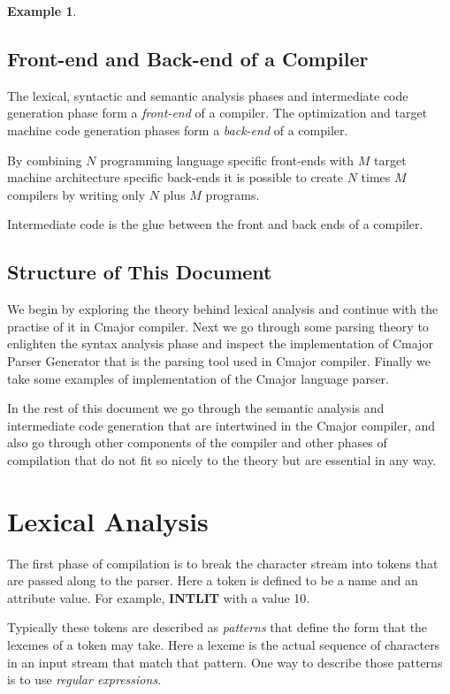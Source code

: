 \documentclass[a4paper,oneside,11pt]{book}
\theoremstyle{definition}
\newtheorem{exmp}{Example}[section]
\begin{document}
\begin{exmp}
\begin{enumerate}
\section{Front-end and Back-end of a Compiler}

The lexical, syntactic and semantic analysis phases and intermediate code generation phase
form a \emph{front-end} of a compiler. The optimization and target machine code generation phases
form a \emph{back-end} of a compiler.

By combining $N$ programming language specific front-ends with $M$ target machine architecture specific back-ends
it is possible to create $N$ times $M$ compilers by writing only $N$ plus $M$ programs.

Intermediate code is the glue between the front and back ends of a compiler.

\section{Structure of This Document}

We begin by exploring the theory behind lexical analysis and continue with the practise of it in Cmajor compiler.
Next we go through some parsing theory to enlighten the syntax analysis phase and inspect the implementation of
Cmajor Parser Generator that is the parsing tool used in Cmajor compiler.
Finally we take some examples of implementation of the Cmajor language parser.

In the rest of this document we go through the semantic analysis and intermediate code generation that
are intertwined in the Cmajor compiler, and also go through other components of the compiler and other phases of
compilation that do not fit so nicely to the theory but are essential in any way.

\end{enumerate}
\end{exmp}

\chapter{Lexical Analysis}

The first phase of compilation is to break the character stream into tokens that are passed along to the parser.
Here a token is defined to be a name and an attribute value.
For example, \textbf{INTLIT} with a value 10.

Typically these tokens are described as \emph{patterns} that define the form
that the lexemes of a token may take. Here a lexeme is the actual sequence of
characters in an input stream that match that pattern.
One way to describe those patterns is to use \emph{regular expressions}.
\end{document}
